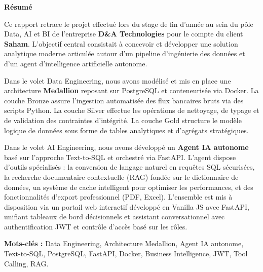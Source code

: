 \documentclass[a4paper,12pt]{report}
\begin{document}
\newpage
\thispagestyle{empty}
\begin{center}
\vspace{1cm}
    \textbf{\huge{Résumé}}
\end{center}
\vspace{1cm}
\begin{doublespace}
\large
\noindent
Ce rapport retrace le projet effectué lors du stage de fin d'année au sein du pôle Data, AI et BI de l'entreprise \textbf{D\&A Technologies} pour le compte du client \textbf{Saham}. L'objectif central consistait à concevoir et développer une solution analytique moderne articulée autour d'un pipeline d'ingénierie des données et d'un agent d'intelligence artificielle autonome.

\noindent
Dans le volet Data Engineering, nous avons modélisé et mis en place une architecture \textbf{Medallion} reposant sur PostgreSQL et conteneurisée via Docker. La couche Bronze assure l'ingestion automatisée des flux bancaires bruts via des scripts Python. La couche Silver effectue les opérations de nettoyage, de typage et de validation des contraintes d'intégrité. La couche Gold structure le modèle logique de données sous forme de tables analytiques et d'agrégats stratégiques.

\noindent
Dans le volet AI Engineering, nous avons développé un \textbf{Agent IA autonome} basé sur l'approche Text-to-SQL et orchestré via FastAPI. L'agent dispose d'outils spécialisés : la conversion de langage naturel en requêtes SQL sécurisées, la recherche documentaire contextuelle (RAG) fondée sur le dictionnaire de données, un système de cache intelligent pour optimiser les performances, et des fonctionnalités d'export professionnel (PDF, Excel). L'ensemble est mis à disposition via un portail web interactif développé en Vanilla JS avec FastAPI, unifiant tableaux de bord décisionnels et assistant conversationnel avec authentification JWT et contrôle d'accès basé sur les rôles.
\end{doublespace}

\vspace{0.8cm}
\noindent \textbf{Mots-clés :} Data Engineering, Architecture Medallion, Agent IA autonome, Text-to-SQL, PostgreSQL, FastAPI, Docker, Business Intelligence, JWT, Tool Calling, RAG.
\end{document}
